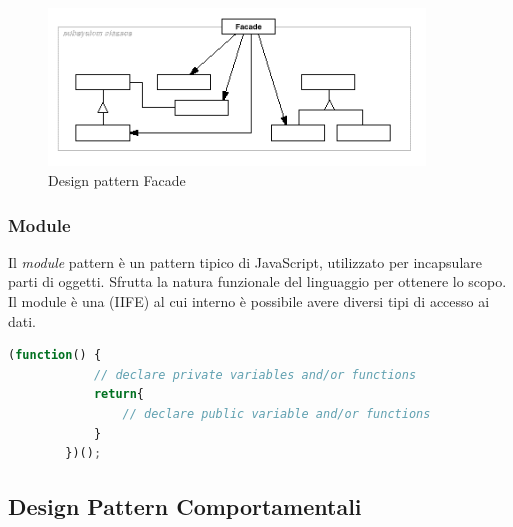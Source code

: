 \begin{figure}[H]
	\centering
	\includegraphics[width=10cm]{diagrammi_img/facade.png}
	\caption{Design pattern Facade}
\end{figure}

\subsubsection{Module}
Il \textit{module} pattern è un pattern tipico di JavaScript, utilizzato per incapsulare parti di oggetti.
Sfrutta la natura funzionale del linguaggio per ottenere lo scopo. Il module è una  (IIFE) al cui interno è possibile avere diversi tipi di accesso ai dati.
\begin{center}
	\begin{lstlisting}[language=JavaScript, caption=Design pattern Module]
		(function() {
			// declare private variables and/or functions
			return{
				// declare public variable and/or functions
			}
		})();
	\end{lstlisting}
\end{center}

\subsection{Design Pattern Comportamentali}

